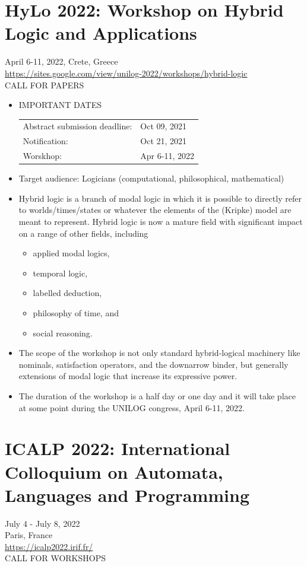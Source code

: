 \documentclass[prodmode,acmtecs]{acmsmall} %
\begin{document}
\section{HyLo 2022: Workshop on Hybrid Logic and Applications }\label{HyLo2022}  April 6-11, 2022, Crete, Greece\\ 
  \href{https://sites.google.com/view/unilog-2022/workshops/hybrid-logic}{https://sites.google.com/view/unilog-2022/workshops/hybrid-logic}\\ 
CALL FOR PAPERS 

\begin{itemize}\item  IMPORTANT DATES 
 
\begin{tabulary}{\linewidth}{LL}Abstract submission deadline:  & Oct 09, 2021 \\
Notification:  & Oct 21, 2021 \\
Worskhop:  & Apr 6-11, 2022 \\
\end{tabulary}
 
\item  Target audience: Logicians (computational, philosophical, mathematical) 
 
\item  Hybrid logic is a branch of modal logic in which it is possible to directly refer to worlds/times/states or whatever the elements of the (Kripke) model are meant to represent. Hybrid logic is now a mature field with significant impact on a range of other fields, including  
 
\begin{itemize}\item  applied modal logics,
\item  temporal logic,
\item  labelled deduction,
\item  philosophy of time, and
\item  social reasoning.
\end{itemize} 
\item  The scope of the workshop is not only standard hybrid-logical machinery like nominals, satisfaction operators, and the downarrow binder, but generally extensions of modal logic that increase its expressive power. 
 
\item  The duration of the workshop is a half day or one day and it will take place at some point during the UNILOG congress, April 6-11, 2022. 
 
\end{itemize}\section{ICALP 2022: International Colloquium on Automata, Languages and Programming}\label{ICALP2022}  July 4 - July 8, 2022\\ 
  Paris, France\\ 
  \href{https://icalp2022.irif.fr/}{https://icalp2022.irif.fr/}\\ 
CALL FOR WORKSHOPS 
\end{document}
